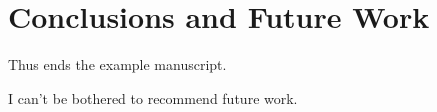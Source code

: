 \documentclass[preprint,3p,11pt,sort]{elsarticle}
\begin{document}
\section{Conclusions and Future Work} \label{sec:conclusions}
Thus ends the example manuscript.

I can't be bothered to recommend future work.


\FloatBarrier



\end{document}
